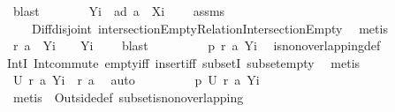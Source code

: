 \begin{isabellebody}
\ blast\isanewline
\ \ \ \ \isamarkupfalse%
\ \isamarkupfalse%
\ {\isachardoublequoteopen}{\isacharquery}Yi\ {\isasyminter}\ {\isacharparenleft}a{\isacharbackquote}{\isacharbackquote}{\isacharparenleft}{\isacharquery}d\ a\ {\isacharminus}\ {\isacharquery}Xi{\isacharparenright}{\isacharparenright}\ {\isacharequal}\ {\isacharbraceleft}{\isacharbraceright}{\isachardoublequoteclose}\ \isamarkupfalse%
\ assms\ {}\ {}\ \isanewline
\ \ \ \ Diff{\isacharunderscore}disjoint\ intersectionEmptyRelationIntersectionEmpty\ \isamarkupfalse%
\ metis\isanewline
\ \ \ \ \isamarkupfalse%
\ \isamarkupfalse%
\ \isamarkupfalse%
\ {\isachardoublequoteopen}{\isacharquery}r\ {\isacharquery}a{}\ {\isasyminter}\ {\isacharquery}Yi\ {\isacharequal}\ {\isacharbraceleft}{\isacharbraceright}\ {\isacharampersand}\ {\isacharquery}Yi\ {\isasymnoteq}\ {\isacharbraceleft}{\isacharbraceright}{\isachardoublequoteclose}\ \isamarkupfalse%
\ blast\isanewline
\ \ \ \ \isamarkupfalse%
\ \isamarkupfalse%
\ \isamarkupfalse%
\ {\isachardoublequoteopen}{\isacharquery}p\ {\isacharbraceleft}{\isacharquery}r\ {\isacharquery}a{}{\isacharcomma}\ {\isacharquery}Yi{\isacharbraceright}{\isachardoublequoteclose}\ \isamarkupfalse%
\ is{\isacharunderscore}non{\isacharunderscore}overlapping{\isacharunderscore}def\ \isamarkupfalse%
\ \ \isanewline
IntI\ Int{\isacharunderscore}commute\ empty{\isacharunderscore}iff\ insert{\isacharunderscore}iff\ subsetI\ subset{\isacharunderscore}empty\ \isamarkupfalse%
\ metis\isanewline
\ \ \ \ \isamarkupfalse%
\ \isamarkupfalse%
\ {\isachardoublequoteopen}{\isacharquery}U\ {\isacharbraceleft}{\isacharquery}r\ {\isacharquery}a{}{\isacharcomma}\ {\isacharquery}Yi{\isacharbraceright}\ {\isasymsubseteq}\ {\isacharquery}r\ a{\isachardoublequoteclose}\ \isamarkupfalse%
\ auto\isanewline
\ \ \ \ \isamarkupfalse%
\ \isamarkupfalse%
\ \isamarkupfalse%
\ {\isachardoublequoteopen}{\isacharquery}p\ {\isacharparenleft}{\isacharquery}U\ {\isacharbraceleft}{\isacharquery}r\ {\isacharquery}a{}{\isacharcomma}\ {\isacharquery}Yi{\isacharbraceright}{\isacharparenright}{\isachardoublequoteclose}\ \isamarkupfalse%
\ {\isacharparenleft}metis\ {\isachardoublequoteopen}{}{\isachardoublequoteclose}\ Outside{\isacharunderscore}def\ subset{\isacharunderscore}is{\isacharunderscore}non{\isacharunderscore}overlapping{\isacharparenright}\isanewline

\end{isabellebody}
